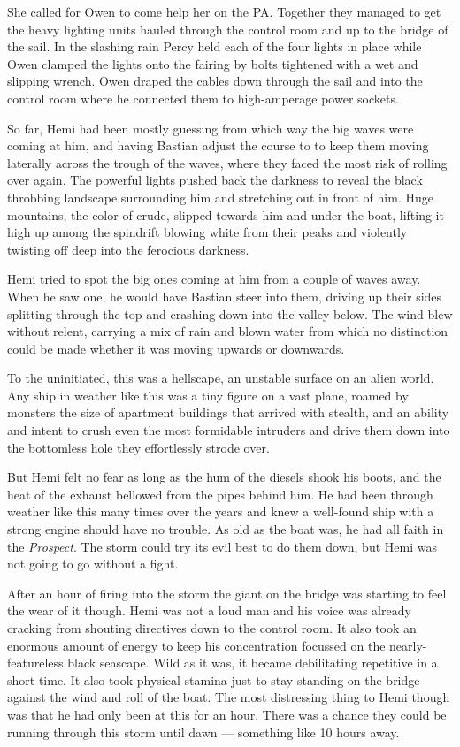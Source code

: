 \documentclass[]{scrbook}
\begin{document}
She called for Owen to come help her on the PA. Together they managed to
get the heavy lighting units hauled through the control room and up to
the bridge of the sail. In the slashing rain Percy held each of the four
lights in place while Owen clamped the lights onto the fairing by bolts
tightened with a wet and slipping wrench. Owen draped the cables down
through the sail and into the control room where he connected them to
high-amperage power sockets.

So far, Hemi had been mostly guessing from which way the big waves were
coming at him, and having Bastian adjust the course to to keep them
moving laterally across the trough of the waves, where they faced the
most risk of rolling over again. The powerful lights pushed back the
darkness to reveal the black throbbing landscape surrounding him and
stretching out in front of him. Huge mountains, the color of crude,
slipped towards him and under the boat, lifting it high up among the
spindrift blowing white from their peaks and violently twisting off deep
into the ferocious darkness.

Hemi tried to spot the big ones coming at him from a couple of waves
away. When he saw one, he would have Bastian steer into them, driving up
their sides splitting through the top and crashing down into the valley
below. The wind blew without relent, carrying a mix of rain and blown
water from which no distinction could be made whether it was moving
upwards or downwards.

To the uninitiated, this was a hellscape, an unstable surface on an
alien world. Any ship in weather like this was a tiny figure on a vast
plane, roamed by monsters the size of apartment buildings that arrived
with stealth, and an ability and intent to crush even the most
formidable intruders and drive them down into the bottomless hole they
effortlessly strode over.

But Hemi felt no fear as long as the hum of the diesels shook his boots,
and the heat of the exhaust bellowed from the pipes behind him. He had
been through weather like this many times over the years and knew a
well-found ship with a strong engine should have no trouble. As old as
the boat was, he had all faith in the \emph{Prospect}. The storm could
try its evil best to do them down, but Hemi was not going to go without
a fight.

After an hour of firing into the storm the giant on the bridge was
starting to feel the wear of it though. Hemi was not a loud man and his
voice was already cracking from shouting directives down to the control
room. It also took an enormous amount of energy to keep his
concentration focussed on the nearly-featureless black seascape. Wild as
it was, it became debilitating repetitive in a short time. It also took
physical stamina just to stay standing on the bridge against the wind
and roll of the boat. The most distressing thing to Hemi though was that
he had only been at this for an hour. There was a chance they could be
running through this storm until dawn --- something like 10 hours away.
\end{document}
